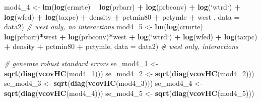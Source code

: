 \documentclass[]{article}
\newenvironment{Shaded}{\begin{snugshade}}{\end{snugshade}}
\newcommand{\CommentTok}[1]{\textcolor[rgb]{0.56,0.35,0.01}{\textit{#1}}}
\newcommand{\DataTypeTok}[1]{\textcolor[rgb]{0.13,0.29,0.53}{#1}}
\newcommand{\DecValTok}[1]{\textcolor[rgb]{0.00,0.00,0.81}{#1}}
\newcommand{\KeywordTok}[1]{\textcolor[rgb]{0.13,0.29,0.53}{\textbf{#1}}}
\newcommand{\NormalTok}[1]{#1}
\newcommand{\OperatorTok}[1]{\textcolor[rgb]{0.81,0.36,0.00}{\textbf{#1}}}
\newcommand{\StringTok}[1]{\textcolor[rgb]{0.31,0.60,0.02}{#1}}
\begin{document}
\begin{Shaded}
\begin{Highlighting}[]
\NormalTok{mod4_}\DecValTok{4}\NormalTok{ <-}\StringTok{ }\KeywordTok{lm}\NormalTok{(}\KeywordTok{log}\NormalTok{(crmrte) }\OperatorTok{~}\StringTok{ }\KeywordTok{log}\NormalTok{(prbarr) }\OperatorTok{+}\StringTok{ }\KeywordTok{log}\NormalTok{(prbconv) }\OperatorTok{+}\StringTok{ }\KeywordTok{log}\NormalTok{(}\StringTok{`}\DataTypeTok{wtrd}\StringTok{`}\NormalTok{)  }\OperatorTok{+}\StringTok{ }\KeywordTok{log}\NormalTok{(wfed) }\OperatorTok{+}\StringTok{ }\KeywordTok{log}\NormalTok{(taxpc) }\OperatorTok{+}\StringTok{ }\NormalTok{density }\OperatorTok{+}\StringTok{ }\NormalTok{pctmin80 }\OperatorTok{+}\StringTok{ }\NormalTok{pctymle }\OperatorTok{+}\StringTok{  }\NormalTok{west , }\DataTypeTok{data =}\NormalTok{ data2)  }\CommentTok{# west only, no interactions}
\NormalTok{mod4_}\DecValTok{5}\NormalTok{ <-}\StringTok{ }\KeywordTok{lm}\NormalTok{(}\KeywordTok{log}\NormalTok{(crmrte) }\OperatorTok{~}\StringTok{ }\KeywordTok{log}\NormalTok{(prbarr)}\OperatorTok{*}\NormalTok{west }\OperatorTok{+}\StringTok{ }\KeywordTok{log}\NormalTok{(prbconv)}\OperatorTok{*}\NormalTok{west }\OperatorTok{+}\StringTok{ }\KeywordTok{log}\NormalTok{(}\StringTok{`}\DataTypeTok{wtrd}\StringTok{`}\NormalTok{)  }\OperatorTok{+}\StringTok{ }\KeywordTok{log}\NormalTok{(wfed) }\OperatorTok{+}\StringTok{ }\KeywordTok{log}\NormalTok{(taxpc) }\OperatorTok{+}\StringTok{ }\NormalTok{density }\OperatorTok{+}\StringTok{ }\NormalTok{pctmin80 }\OperatorTok{+}\StringTok{ }\NormalTok{pctymle, }\DataTypeTok{data =}\NormalTok{ data2)  }\CommentTok{# west only, interactions}

\CommentTok{# generate robust standard errors}
\NormalTok{se_mod4_}\DecValTok{1}\NormalTok{ <-}\StringTok{ }\KeywordTok{sqrt}\NormalTok{(}\KeywordTok{diag}\NormalTok{(}\KeywordTok{vcovHC}\NormalTok{(mod4_}\DecValTok{1}\NormalTok{)))}
\NormalTok{se_mod4_}\DecValTok{2}\NormalTok{ <-}\StringTok{ }\KeywordTok{sqrt}\NormalTok{(}\KeywordTok{diag}\NormalTok{(}\KeywordTok{vcovHC}\NormalTok{(mod4_}\DecValTok{2}\NormalTok{)))}
\NormalTok{se_mod4_}\DecValTok{3}\NormalTok{ <-}\StringTok{ }\KeywordTok{sqrt}\NormalTok{(}\KeywordTok{diag}\NormalTok{(}\KeywordTok{vcovHC}\NormalTok{(mod4_}\DecValTok{3}\NormalTok{)))}
\NormalTok{se_mod4_}\DecValTok{4}\NormalTok{ <-}\StringTok{ }\KeywordTok{sqrt}\NormalTok{(}\KeywordTok{diag}\NormalTok{(}\KeywordTok{vcovHC}\NormalTok{(mod4_}\DecValTok{4}\NormalTok{)))}
\NormalTok{se_mod4_}\DecValTok{5}\NormalTok{ <-}\StringTok{ }\KeywordTok{sqrt}\NormalTok{(}\KeywordTok{diag}\NormalTok{(}\KeywordTok{vcovHC}\NormalTok{(mod4_}\DecValTok{5}\NormalTok{)))}


\end{Highlighting}
\end{Shaded}
\end{document}
